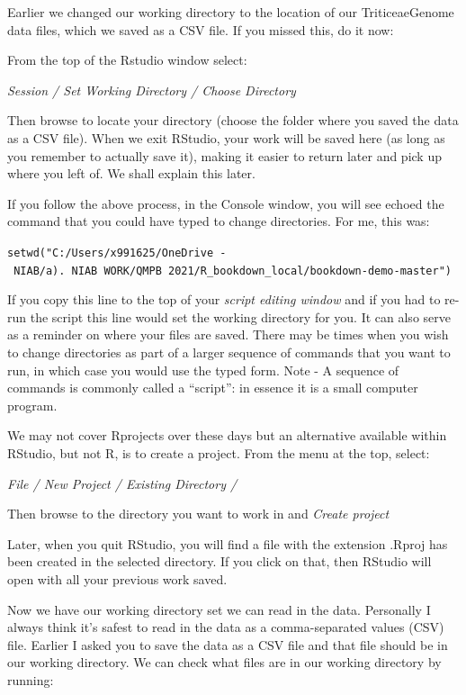 \documentclass[
]{book}
\makeatletter
\newenvironment{kframe}{%
\medskip{}
\setlength{\fboxsep}{.8em}
 \def\at@end@of@kframe{}%
 \ifinner\ifhmode%
  \def\at@end@of@kframe{\end{minipage}}%
  \begin{minipage}{\columnwidth}%
 \fi\fi%
 \def\FrameCommand##1{\hskip\@totalleftmargin \hskip-\fboxsep
 \colorbox{shadecolor}{##1}\hskip-\fboxsep
     \hskip-\linewidth \hskip-\@totalleftmargin \hskip\columnwidth}%
 \MakeFramed {\advance\hsize-\width
   \@totalleftmargin\z@ \linewidth\hsize
   \@setminipage}}%
 {\par\unskip\endMakeFramed%
 \at@end@of@kframe}
\newenvironment{rmdblock}[1]
  {
  \begin{itemize}
  \renewcommand{\labelitemi}{
    \raisebox{-.7\height}[0pt][0pt]{
      {\setkeys{Gin}{width=3em,keepaspectratio}\texttt{[image: images/\#1]}}
    }
  }
  \setlength{\fboxsep}{1em}
  \begin{kframe}
  \item
  }
  {
  \end{kframe}
  \end{itemize}
  }
\newenvironment{rmdtip}
  {\begin{rmdblock}{tip}}
  {\end{rmdblock}}
\makeatother
\begin{document}
Earlier we changed our working directory to the location of our TriticeaeGenome data files, which we saved as a CSV file. If you missed this, do it now:

From the top of the Rstudio window select:

\emph{Session / Set Working Directory / Choose Directory}

Then browse to locate your directory (choose the folder where you saved the data as a CSV file). When we exit RStudio, your work will be saved here (as long as you remember to actually save it), making it easier to return later and pick up where you left of. We shall explain this later.

If you follow the above process, in the Console window, you will see echoed the command that you could have typed to change directories. For me, this was:

\texttt{setwd("C:/Users/x991625/OneDrive\ -\ NIAB/a).\ NIAB\ WORK/QMPB\ 2021/R\_bookdown\_local/bookdown-demo-master")}

\begin{rmdtip}
If you copy this line to the top of your \emph{script editing window} and if you had to re-run the script this line would set the working directory for you. It can also serve as a reminder on where your files are saved. There may be times when you wish to change directories as part of a larger sequence of commands that you want to run, in which case you would use the typed form. Note - A sequence of commands is commonly called a ``script'': in essence it is a small computer program.
\end{rmdtip}

We may not cover Rprojects over these days but an alternative available within RStudio, but not R, is to create a project. From the menu at the top, select:

\emph{File / New Project / Existing Directory /}

Then browse to the directory you want to work in and \emph{Create project}

Later, when you quit RStudio, you will find a file with the extension .Rproj has been created in the selected directory. If you click on that, then RStudio will open with all your previous work saved.

Now we have our working directory set we can read in the data. Personally I always think it's safest to read in the data as a comma-separated values (CSV) file. Earlier I asked you to save the data as a CSV file and that file should be in our working directory. We can check what files are in our working directory by running:
\end{document}
